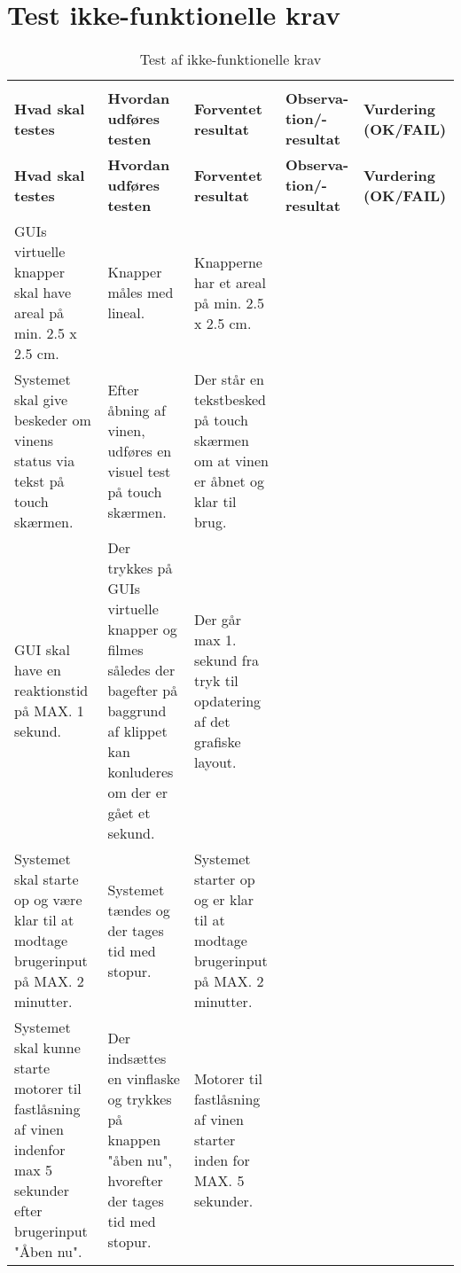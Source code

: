 \section{Test ikke-funktionelle krav}

\begin{longtable}{ p{2cm}  p{2cm}  p{2cm}  p{1.5cm} p{2cm} }
	\rowcolor{white}\caption{Test af ikke-funktionelle krav}
    \label{AT:ikke-funktionelle-krav}\\
	\rowcolor{white}\bfseries{Hvad skal testes} & \bfseries{Hvordan udføres testen}& \bfseries{Forventet resultat} & \bfseries{Observa-tion/-resultat} & \textbf{Vurdering (OK/FAIL)} \\
	\toprule
   \endfirsthead
   \rowcolor{white}
   \bfseries{Hvad skal testes} & \bfseries{Hvordan udføres testen}& \bfseries{Forventet resultat} & \bfseries{Observa-tion/-resultat} & \textbf{Vurdering (OK/FAIL)} \\
   \toprule
   \endhead

    GUIs virtuelle knapper skal have areal på min. 2.5 x 2.5 cm. & Knapper måles med lineal. & Knapperne har et areal på min. 2.5 x 2.5 cm.  & &\\ 
    
    Systemet skal give beskeder om vinens status via tekst på touch skærmen. & Efter åbning af vinen, udføres en visuel test på touch skærmen. & Der står en tekstbesked på touch skærmen om at vinen er åbnet og klar til brug. & &\\
    
    GUI skal have en reaktionstid på MAX. 1 sekund. & Der trykkes på GUIs virtuelle knapper og filmes således der bagefter på baggrund af klippet kan konluderes om der er gået et sekund. & Der går max 1. sekund fra tryk til opdatering af det grafiske layout. & &\\
    
	Systemet skal starte op og være klar til at modtage brugerinput på MAX. 2 minutter.& Systemet tændes og der tages tid med stopur.& Systemet starter op og er klar til at modtage brugerinput på MAX. 2 minutter. & &\\
	
	Systemet skal kunne starte motorer til fastlåsning af vinen indenfor max 5 sekunder efter brugerinput "Åben nu".& Der indsættes en vinflaske og trykkes på knappen "åben nu", hvorefter der tages tid med stopur.& Motorer til fastlåsning af vinen starter inden for MAX. 5 sekunder. & &\\
	

\end{longtable}
